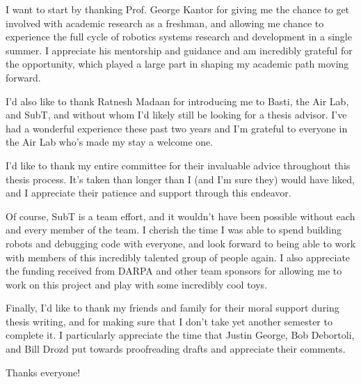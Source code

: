 \documentclass[12pt]{cmuthesis}
\begin{document}
\begin{acknowledgments}
	I want to start by thanking Prof. George Kantor for giving me the chance to get involved with academic research as a freshman, and allowing me chance to experience the full cycle of robotics systems research and development in a single summer. I appreciate his mentorship and guidance and am incredibly grateful for the opportunity, which played a large part in shaping my academic path moving forward. 
	
	I'd also like to thank Ratnesh Madaan for introducing me to Basti, the Air Lab, and SubT, and without whom I'd likely still be looking for a thesis advisor. I've had a wonderful experience these past two years and I'm grateful to everyone in the Air Lab who's made my stay a welcome one.
	
	I'd like to thank my entire committee for their invaluable advice throughout this thesis process. It's taken than longer than I (and I'm sure they) would have liked, and I appreciate their patience and support through this endeavor.
	
	Of course, SubT is a team effort, and it wouldn't have been possible without each and every member of the team. I cherish the time I was able to spend building robots and debugging code with everyone, and look forward to being able to work with members of this incredibly talented group of people again. I also appreciate the funding received from DARPA and other team sponsors for allowing me to work on this project and play with some incredibly cool toys.
	
	Finally, I'd like to thank my friends and family for their moral support during thesis writing, and for making sure  that I don't take yet another semester to complete it. I particularly appreciate the time that Justin George, Bob Debortoli, and Bill Drozd put towards proofreading drafts and appreciate their comments.
	
\begin{center}
Thanks everyone!
\end{center}

	
\end{acknowledgments}

\tableofcontents
\listoffigures
\listoftables

\mainmatter


%
%
%
%
%
\end{document}
